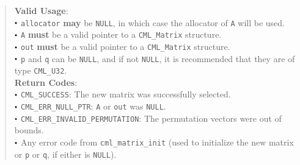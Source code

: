 \documentclass[a4paper,oneside,8pt]{extarticle}
\renewcommand{\dot}{\raisebox{0.3ex}{\scalebox{0.6}{$\bullet$}}}
\theoremstyle{definition}
\begin{document}
\begin{quote}
  \vspace{-0.75em}
  \textbf{Valid Usage}: \\
  $\dot$ \texttt{allocator} \textbf{may} be \texttt{NULL}, in which case the allocator of \texttt{A} will be used. \\
  $\dot$ \texttt{A} \textbf{must} be a valid pointer to a \texttt{CML\_Matrix} structure. \\
  $\dot$ \texttt{out} \textbf{must} be a valid pointer to a \texttt{CML\_Matrix} structure. \\
  $\dot$ \texttt{p} and \texttt{q} can be \texttt{NULL}, and if not \texttt{NULL}, it is recommended that they are of type \texttt{CML\_U32}. \\

  \vspace{-0.75em}
  \textbf{Return Codes}: \\
  $\dot$ \texttt{CML\_SUCCESS}: The new matrix was successfully selected. \\
  $\dot$ \texttt{CML\_ERR\_NULL\_PTR}: \texttt{A} or \texttt{out} was \texttt{NULL}. \\
  $\dot$ \texttt{CML\_ERR\_INVALID\_PERMUTATION}: The permutation vectors were out of bounds. \\
  $\dot$ Any error code from \texttt{cml\_matrix\_init} (used to initialize the new matrix or \texttt{p} or \texttt{q}, if either is \texttt{NULL}). \\
\end{quote}
\end{document}
